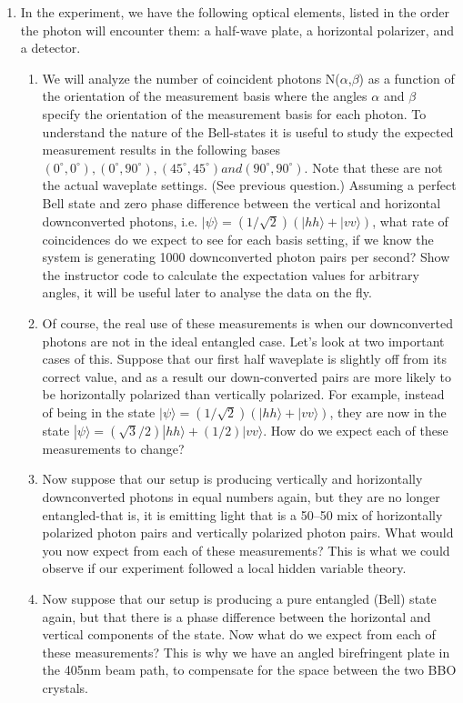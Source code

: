 \documentclass{../signatures}
\begin{document}
\begin{enumerate}
    \item In the experiment, we have the following optical elements, listed in the order the photon will encounter them: a half-wave plate, a horizontal polarizer, and a detector.
    \begin{enumerate}
      \item{We will analyze the number of coincident photons  N($\alpha$,$\beta$) as a function of the orientation of the measurement basis where the angles $\alpha$ and $\beta$ specify the orientation of the measurement basis for each photon. To understand the nature of the Bell-states it is useful to study the expected measurement results in the following bases $(0^\circ,0^\circ), (0^\circ,90^\circ), (45^\circ,45^\circ) and (90^\circ,90^\circ)$. Note that these are not the actual waveplate settings. (See previous question.) Assuming a perfect Bell state and zero phase difference between the vertical and horizontal downconverted photons, i.e. $|\psi\rangle=(1/\sqrt{2})(|hh\rangle + |vv\rangle)$, what rate of coincidences do we expect to see for each basis setting, if we know the system is generating 1000 downconverted photon pairs per second? Show the instructor code to calculate the expectation values for arbitrary angles, it will be useful later to analyse the data on the fly.}
      \item{Of course, the real use of these measurements is when our downconverted photons are not in the ideal entangled case. Let's look at two important cases of this. Suppose that our first half waveplate is slightly off from its correct value, and as a result our down-converted pairs are more likely to be horizontally polarized than vertically polarized. For example, instead of being in the state $|\psi\rangle=(1/\sqrt{2})(|hh\rangle + |vv\rangle)$, they are now in the state $|\psi\rangle= (\sqrt{3}/2) |hh\rangle + (1/2) |vv\rangle$. How do we expect each of these measurements to change?}
      \item{Now suppose that our setup is producing vertically and horizontally downconverted photons in equal numbers again, but they are no longer entangled-that is, it is emitting light that is a 50–50 mix of horizontally polarized photon pairs and vertically polarized photon pairs. What would you now expect from each of these measurements? This is what we could observe if our experiment followed a local hidden variable theory.}
      \item{Now suppose that our setup is producing a pure entangled (Bell) state again, but that there is a phase difference between the horizontal and vertical components of the state. Now what do we expect from each of these measurements? This is why we have an angled birefringent plate in the 405nm beam path, to compensate for the space between the two BBO crystals.}
    \end{enumerate}


\end{enumerate}
\end{document}
